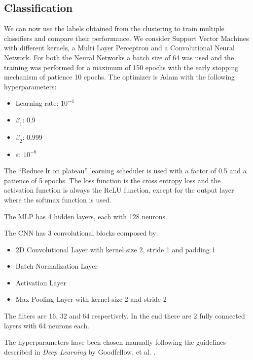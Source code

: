 \subsection{Classification}
We can now use the labels obtained from the clustering to train multiple
classifiers and compare their performance.
We consider Support Vector Machines with different kernels, a Multi Layer
Perceptron and a Convolutional Neural Network.
For both the Neural Networks a batch size of 64 was used and the training
was performed for a maximum of 150 epochs with the early stopping mechanism
of patience 10 epochs.
The optimizer is Adam with the following hyperparameters:
\begin{itemize}
    \item Learning rate: $10^{-4}$
    \item $\beta_1$: 0.9
    \item $\beta_2$: 0.999
    \item $\varepsilon$: $10^{-8}$
\end{itemize}
The \enquote{Reduce lr on plateau} learning scheduler is used with a factor
of 0.5 and a patience of 5 epochs.
The loss function is the cross entropy loss and the activation function
is always the ReLU function, except for the output layer where the softmax
function is used.

The MLP has 4 hidden layers, each with 128 neurons.

The CNN has 3 convolutional blocks composed by:
\begin{itemize}
    \item 2D Convolutional Layer with kernel size 2, stride 1 and padding 1
    \item Batch Normalization Layer
    \item Activation Layer
    \item Max Pooling Layer with kernel size 2 and stride 2
\end{itemize}
The filters are 16, 32 and 64 respectively. In the end there are 2 fully
connected layers with 64 neurons each.

The hyperparameters have been chosen manually following the guidelines
described in \textit{Deep Learning} by Goodfellow, et al. \cite{goodfellow2016deep}.



